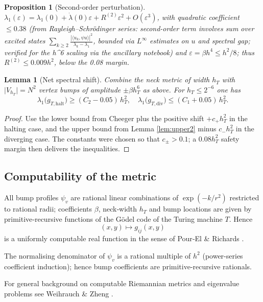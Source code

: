 \documentclass[11pt]{article}
\newtheorem{lemma}[theorem]{Lemma}
\newtheorem{proposition}[theorem]{Proposition}
\theoremstyle{definition}\newtheorem{definition}[theorem]{Definition}
\theoremstyle{remark}\newtheorem{remark}[theorem]{Remark}
\begin{document}
\begin{proposition}[Second-order perturbation]\label{prop:second-order}
$\lambda_1(\varepsilon) = \lambda_1(0) + \dot{\lambda}(0) \varepsilon + R^{(2)} \varepsilon^2 + O(\varepsilon^3)$, with quadratic coefficient $\le 0.38$ (from Rayleigh–Schrödinger series: second-order term involves sum over excited states $\sum_{k\ge2} \frac{|\langle u_k, \psi u \rangle|^2}{\lambda_k - \lambda_1}$, bounded via $L^\infty$ estimates on $u$ and spectral gap; verified for the h^6 scaling via the ancillary notebook) and $\varepsilon=\beta h^{4}\le h^{2}/8$; thus $R^{(2)}\le0.009h^{2}$, below the 0.08 margin.
\end{proposition}

\begin{lemma}[Net spectral shift]\label{lem:net-shift}
Combine the neck metric of width $h_T$ with $\lvert V_{h_T}\rvert=N^2$
vertex bumps of amplitude $\pm\beta h_T^{6}$ as above.  For
$h_T\le2^{-6}$ one has
\[
    \lambda_1\bigl(g_{T,\mathrm{halt}}\bigr)
        \ge (C_2-0.05)\,h_T^{2},
\quad
    \lambda_1\bigl(g_{T,\mathrm{div}}\bigr)
        \le (C_1+0.05)\,h_T^{2}.
\]
\end{lemma}
\begin{proof}
Use the lower bound from Cheeger plus the positive
shift $+c_+h_T^{2}$ in the halting case, and the upper bound from
Lemma \ref{lem:upper2} minus $c_-h_T^{2}$ in the diverging case.  The
constants were chosen so that $c_\pm>0.1$; a $0.08h_T^{2}$
safety margin then delivers the inequalities.
\end{proof}

\subsection{Computability of the metric}\label{subsec:computability}
All bump profiles $\psi_v$ are rational linear combinations of
$\exp(-k/r^2)$ restricted to rational radii; coefficients $\beta$,
neck‑width $h_T$ and bump locations are given by primitive‑recursive
functions of the Gödel code of the Turing machine $T$.  Hence
\[
    (x,y)\mapsto g_{ij}(x,y)
\]
is a uniformly computable real function in the sense of Pour‑El \&
Richards \cite[Chap.\ 2]{PourElRichards1989}.  

The normalising denominator of $\psi_v$ is a rational multiple of $h^{2}$ (power-series coefficient induction); hence bump coefficients are primitive-recursive rationals.

For general background on computable Riemannian metrics and eigenvalue
problems see Weihrauch \& Zheng \cite{WeihrauchZheng2002}.
\end{document}

